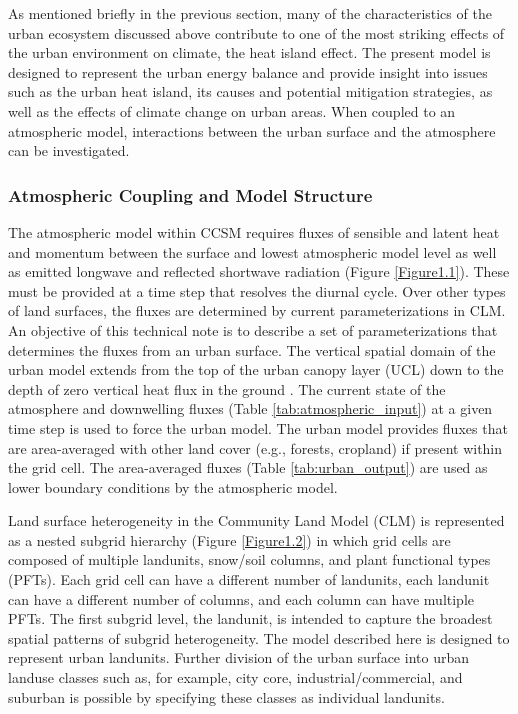 \documentclass[12pt,authoryear]{elsarticle}
\numberwithin{equation}{section} %
\begin{document}
As mentioned briefly in the previous section, many of the characteristics of the urban ecosystem discussed above contribute to one of the most striking effects of the urban environment on climate, the heat island effect. The present model is designed to represent the urban energy balance and provide insight into issues such as the urban heat island, its causes and potential mitigation strategies, as well as the effects of climate change on urban areas. When coupled to an atmospheric model, interactions between the urban surface and the atmosphere can be investigated.

\subsubsection{Atmospheric Coupling and Model Structure}
\label{sec:atmospheric_coupling_model_structure}
%
The atmospheric model within CCSM requires fluxes of sensible and latent heat and momentum between the surface and lowest atmospheric model level as well as emitted longwave and reflected shortwave radiation (Figure \ref{Figure1.1}). These must be provided at a time step that resolves the diurnal cycle. Over other types of land surfaces, the fluxes are determined by current parameterizations in CLM. An objective of this technical note is to describe a set of parameterizations that determines the fluxes from an urban surface. The vertical spatial domain of the urban model extends from the top of the urban canopy layer (UCL) down to the depth of zero vertical heat flux in the ground \citep{okeBoundaryLayerClimates1987}. The current state of the atmosphere and downwelling fluxes (Table \ref{tab:atmospheric_input}) at a given time step is used to force the urban model. The urban model provides fluxes that are area-averaged with other land cover (e.g., forests, cropland) if present within the grid cell. The area-averaged fluxes (Table \ref{tab:urban_output}) are used as lower boundary conditions by the atmospheric model.

Land surface heterogeneity in the Community Land Model (CLM) is represented as a nested subgrid hierarchy (Figure \ref{Figure1.2}) in which grid cells are composed of multiple landunits, snow/soil columns, and plant functional types (PFTs). Each grid cell can have a different number of landunits, each landunit can have a different number of columns, and each column can have multiple PFTs. The first subgrid level, the landunit, is intended to capture the broadest spatial patterns of subgrid heterogeneity. The model described here is designed to represent urban landunits. Further division of the urban surface into urban landuse classes such as, for example, city core, industrial/commercial, and suburban is possible by specifying these classes as individual landunits.
\end{document}
